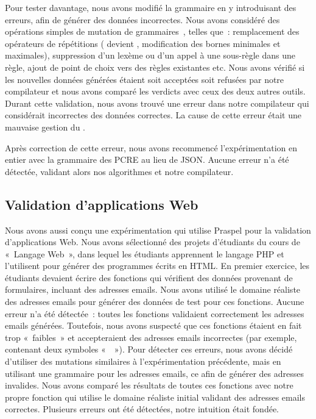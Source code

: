 Pour tester davantage, nous avons modifié la grammaire en y introduisant des
erreurs, afin de générer des données incorrectes. Nous avons considéré des
opérations simples de mutation de grammaires~, telles que~:
remplacement des opérateurs de répétitions (\code{+} devient \code{*},
modification des bornes minimales et maximales), suppression d'un lexème ou d'un
appel à une sous-règle dans une règle, ajout de point de choix vers des règles
existantes etc. Nous avons vérifié si les nouvelles données générées étaient
soit acceptées soit refusées par notre compilateur et nous avons comparé les
verdicts avec ceux des deux autres outils. Durant cette validation, nous avons
trouvé une erreur dans notre compilateur qui considérait incorrectes des données
correctes. La cause de cette erreur était une mauvaise gestion du
.

Après correction de cette erreur, nous avons recommencé l'expérimentation en
entier avec la grammaire des PCRE au lieu de JSON. Aucune erreur n'a été
détectée, validant alors nos algorithmes et notre compilateur.

\subsection{Validation d'applications Web}

Nous avons aussi conçu une expérimentation qui utilise Praspel pour la
validation d'applications Web. Nous avons sélectionné des projets d'étudiants du
cours de «~Langage Web~», dans lequel les étudiants apprennent le langage PHP et
l'utilisent pour générer des programmes écrits en HTML. En premier exercice, les
étudiants devaient écrire des fonctions qui vérifient des données provenant de
formulaires, incluant des adresses emails. Nous avons utilisé le domaine
réaliste des adresses emails pour générer des données de test pour ces
fonctions. Aucune erreur n'a été détectée~: toutes les fonctions validaient
correctement les adresses emails générées. Toutefois, nous avons suspecté que
ces fonctions étaient en fait trop «~faibles~» et accepteraient des adresses
emails incorrectes (par exemple, contenant deux symboles «~~»). Pour
détecter ces erreurs, nous avons décidé d'utiliser des mutations similaires à
l'expérimentation précédente, mais en utilisant une grammaire pour les adresses
emails, ce afin de générer des adresses invalides. Nous avons comparé les
résultats de toutes ces fonctions avec notre propre fonction qui utilise le
domaine réaliste initial validant des adresses emails correctes. Plusieurs
erreurs ont été détectées, notre intuition était fondée.

